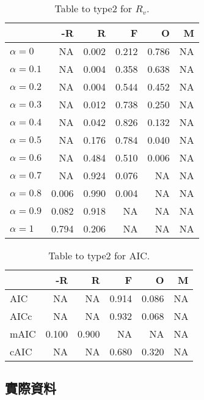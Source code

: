 \begin{table}[h]
\centering
\caption{Table to type2 for $R_v$.}
\label{tab:type2rateR}
\begin{tabular}{lrrrrr}
\toprule
                 & -R    & R     & F     & O     & M \\
\midrule
$\alpha = 0$     & NA    & 0.002 & 0.212 & 0.786 & NA \\
$\alpha = 0.1$   & NA    & 0.004 & 0.358 & 0.638 & NA \\
$\alpha = 0.2$   & NA    & 0.004 & 0.544 & 0.452 & NA \\
$\alpha = 0.3$   & NA    & 0.012 & 0.738 & 0.250 & NA \\
$\alpha = 0.4$   & NA    & 0.042 & 0.826 & 0.132 & NA \\
$\alpha = 0.5$   & NA    & 0.176 & 0.784 & 0.040 & NA \\
$\alpha = 0.6$   & NA    & 0.484 & 0.510 & 0.006 & NA \\
$\alpha = 0.7$   & NA    & 0.924 & 0.076 & NA    & NA \\
$\alpha = 0.8$   & 0.006 & 0.990 & 0.004 & NA    & NA \\
$\alpha = 0.9$   & 0.082 & 0.918 & NA    & NA    & NA \\
$\alpha = 1$     & 0.794 & 0.206 & NA    & NA    & NA \\
\bottomrule
\end{tabular}
\end{table}

\begin{table}[h]
\centering
\caption{Table to type2 for AIC.}
\label{tab:type2rateAIC}
\begin{tabular}{lrrrrr}
\toprule
      & -R    & R     & F     & O     & M \\
\midrule
AIC   & NA    & NA    & 0.914 & 0.086 & NA \\
AICc  & NA    & NA    & 0.932 & 0.068 & NA \\
mAIC  & 0.100 & 0.900 & NA    & NA    & NA \\
cAIC  & NA    & NA    & 0.680 & 0.320 & NA \\
\bottomrule
\end{tabular}
\end{table}



\subsection{實際資料}

\newpage 
